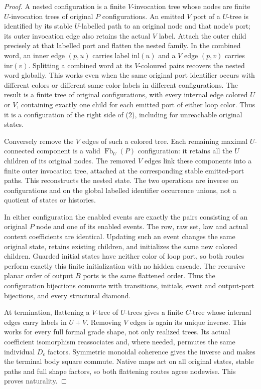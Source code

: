\documentclass[11pt]{article}
\begin{document}
\begin{proof}
A nested configuration is a finite $V$-invocation tree whose nodes are finite $U$-invocation trees of original $P$ configurations. An emitted $V$ port of a $U$-tree is identified by its stable $U$-labelled path to an original node and that node's port; its outer invocation edge also retains the actual $V$ label. Attach the outer child precisely at that labelled port and flatten the nested family. In the combined word, an inner edge $(p,u)$ carries label $\mathrm{inl}(u)$ and a $V$ edge $(p,v)$ carries $\mathrm{inr}(v)$. Splitting a combined word at its $V$-coloured pairs recovers the nested word globally. This works even when the same original port identifier occurs with different colors or different same-color labels in different configurations. The result is a finite tree of original configurations, with every internal edge colored $U$ or $V$, containing exactly one child for each emitted port of either loop color. Thus it is a configuration of the right side of (2), including for unreachable original states.

Conversely remove the $V$ edges of such a colored tree. Each remaining maximal $U$-connected component is a valid $\operatorname{Fb}_U(P)$ configuration: it retains all the $U$ children of its original nodes. The removed $V$ edges link these components into a finite outer invocation tree, attached at the corresponding stable emitted-port paths. This reconstructs the nested state. The two operations are inverse on configurations and on the global labelled identifier occurrence unions, not a quotient of states or histories.

In either configuration the enabled events are exactly the pairs consisting of an original $P$ node and one of its enabled events. The row, raw set, law and actual context coefficients are identical. Updating such an event changes the same original state, retains existing children, and initializes the same new colored children. Guarded initial states have neither color of loop port, so both routes perform exactly this finite initialization with no hidden cascade. The recursive planar order of output $B$ ports is the same flattened order. Thus the configuration bijections commute with transitions, initials, event and output-port bijections, and every structural diamond.

At termination, flattening a $V$-tree of $U$-trees gives a finite $C$-tree whose internal edges carry labels in $U+V$. Removing $V$ edges is again its unique inverse. This works for every full formal grade shape, not only realized trees. Its actual coefficient isomorphism reassociates and, where needed, permutes the same individual $D_c$ factors. Symmetric monoidal coherence gives the inverse and makes the terminal body square commute. Native maps act on all original states, stable paths and full shape factors, so both flattening routes agree nodewise. This proves naturality.


\end{proof}
\end{document}
